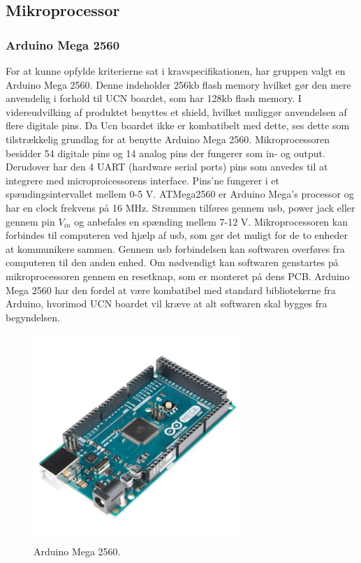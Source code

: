 \subsection{Mikroprocessor}
\subsubsection{Arduino Mega 2560}
For at kunne opfylde kriterierne sat i kravspecifikationen, har gruppen valgt en Arduino Mega 2560. Denne indeholder 256kb flash memory hvilket gør den mere anvendelig i forhold til UCN boardet, som har 128kb flash memory. I videreudvilking af produktet benyttes et shield, hvilket muliggør anvendelsen af flere digitale pins. Da Ucn boardet ikke er kombatibelt med dette, ses dette som tilstrækkelig grundlag for at benytte Arduino Mega 2560. 
\newline
Mikroprocessoren besidder 54 digitale pins og 14 analog pins der fungerer som in- og output. Derudover har den 4 UART (hardware serial ports) pins som anvedes til at integrere med microproicessorens interface. Pins'ne fungerer i et spændingsintervallet mellem 0-5 V. 
\newline
ATMega2560 er Arduino Mega's processor og har en clock frekvens på 16 MHz. Strømmen tilføres gennem usb, power jack eller gennem pin $V_{in}$ og anbefales en spænding mellem 7-12 V. 
\newline
Mikroprocessoren kan forbindes til computeren ved hjælp af usb, som gør det muligt for de to enheder at kommunikere sammen. Gennem usb forbindelsen kan softwaren overføres fra computeren til den anden enhed. Om nødvendigt kan softwaren genstartes på mikroprocessoren gennem en resetknap, som er monteret på dens PCB.
\newline 
Arduino Mega 2560 har den fordel at være kombatibel med standard bibliotekerne fra Arduino, hvorimod UCN boardet vil kræve at alt softwaren skal bygges fra begyndelsen.

\begin{figure}[h!]
  \centering
  \includegraphics[width=0.7\textwidth]{figures/arduinoMega.jpg}
  \caption{Arduino Mega 2560.}
  \label{arduino2569}
\end{figure} 

\newpage



